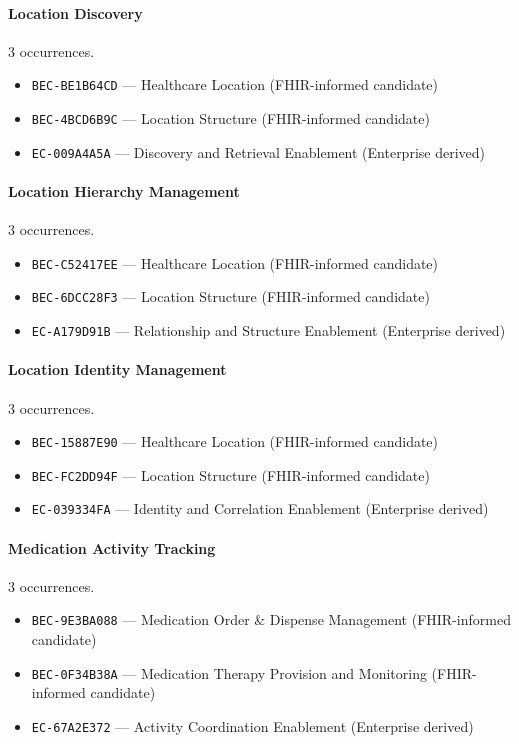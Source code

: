 \documentclass[11pt,a4paper,openany]{book}
\begin{document}
\paragraph{Location Discovery} 3 occurrences.\par
\begin{itemize}
\item \texttt{BEC-BE1B64CD} --- Healthcare Location (FHIR-informed candidate)
\item \texttt{BEC-4BCD6B9C} --- Location Structure (FHIR-informed candidate)
\item \texttt{EC-009A4A5A} --- Discovery and Retrieval Enablement (Enterprise derived)
\end{itemize}
\paragraph{Location Hierarchy Management} 3 occurrences.\par
\begin{itemize}
\item \texttt{BEC-C52417EE} --- Healthcare Location (FHIR-informed candidate)
\item \texttt{BEC-6DCC28F3} --- Location Structure (FHIR-informed candidate)
\item \texttt{EC-A179D91B} --- Relationship and Structure Enablement (Enterprise derived)
\end{itemize}
\paragraph{Location Identity Management} 3 occurrences.\par
\begin{itemize}
\item \texttt{BEC-15887E90} --- Healthcare Location (FHIR-informed candidate)
\item \texttt{BEC-FC2DD94F} --- Location Structure (FHIR-informed candidate)
\item \texttt{EC-039334FA} --- Identity and Correlation Enablement (Enterprise derived)
\end{itemize}
\paragraph{Medication Activity Tracking} 3 occurrences.\par
\begin{itemize}
\item \texttt{BEC-9E3BA088} --- Medication Order \& Dispense Management (FHIR-informed candidate)
\item \texttt{BEC-0F34B38A} --- Medication Therapy Provision and Monitoring (FHIR-informed candidate)
\item \texttt{EC-67A2E372} --- Activity Coordination Enablement (Enterprise derived)
\end{itemize}
\end{document}
